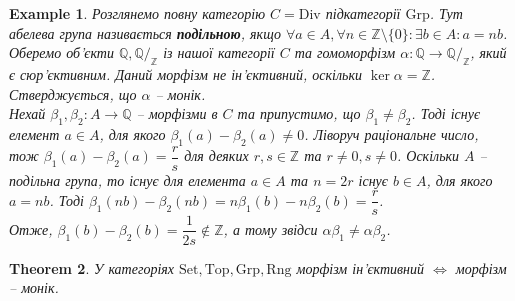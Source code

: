 \documentclass[a4paper, 10pt]{article}
\theoremstyle{theoremdd}
\newtheorem{theorem}{Theorem}[subsection]
\newtheorem{example}[theorem]{Example}
\begin{document}
\begin{example}
Розглянемо повну категорію $C = \text{Div}$ підкатегорії $\text{Grp}$. Тут абелева група називається \textbf{подільною}, якщо $\forall a \in A, \forall n \in \mathbb{Z} \setminus \{0\}: \exists b \in A: a = nb$.\\
Оберемо об'єкти $\mathbb{Q}, \mathbb{Q}/_{\mathbb{Z}}$ із нашої категорії $C$ та гомоморфізм $\alpha \colon \mathbb{Q} \to \mathbb{Q}/_{\mathbb{Z}}$, який є сюр'єктивним. Даний морфізм не ін'єктивний, оскільки $\ker \alpha = \mathbb{Z}$. Стверджується, що $\alpha$ -- монік.\\
Нехай $\beta_1,\beta_2 \colon A \to \mathbb{Q}$ -- морфізми в $C$ та припустимо, що $\beta_1 \neq \beta_2$. Тоді існує елемент $a \in A$, для якого $\beta_1(a) - \beta_2(a) \neq 0$. Ліворуч раціональне число, тож $\beta_1(a) - \beta_2(a) = \dfrac{r}{s}$ для деяких $r,s \in \mathbb{Z}$ та $r \neq 0, s \neq 0$. Оскільки $A$ -- подільна група, то існує для елемента $a \in A$ та $n = 2r$ існує $b \in A$, для якого $a = nb$. Тоді $\beta_1(nb) - \beta_2(nb) = n \beta_1(b) - n \beta_2(b) = \dfrac{r}{s}$.\\
Отже, $\beta_1(b) - \beta_2(b) = \dfrac{1}{2s} \notin \mathbb{Z}$, а тому звідси $\alpha \beta_1 \neq \alpha \beta_2$.
\end{example}

\begin{theorem}
У категоріях $\text{Set},\text{Top},\text{Grp},\text{Rng}$ морфізм ін'єктивний $\iff$ морфізм -- монік.
\end{theorem}
\end{document}
